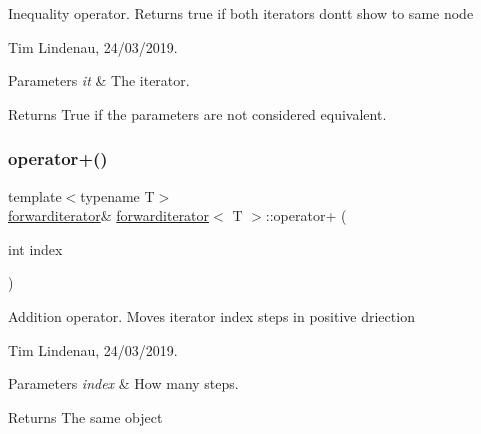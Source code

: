 Inequality operator. Returns true if both iterators dont\textquotesingle{}t show to same node 

Tim Lindenau, 24/03/2019. 


\begin{DoxyParams}{Parameters}
{\em it} & The iterator. \\
\hline
\end{DoxyParams}


\begin{DoxyReturn}{Returns}
True if the parameters are not considered equivalent. 
\end{DoxyReturn}
\mbox{\label{classforwarditerator_a380be6fded24cf931671d22bf0887eb0}} 
\subsubsection{\texorpdfstring{operator+()}{operator+()}}
{\footnotesize\ttfamily template$<$typename T$>$ \\
\mbox{\hyperlink{classforwarditerator}{forwarditerator}}\& \mbox{\hyperlink{classforwarditerator}{forwarditerator}}$<$ T $>$\+::operator+ (\begin{DoxyParamCaption}\item[{int}]{index }\end{DoxyParamCaption})\hspace{0.3cm}{\ttfamily [inline]}}



Addition operator. Moves iterator index steps in positive driection 

Tim Lindenau, 24/03/2019. 


\begin{DoxyParams}{Parameters}
{\em index} & How many steps. \\
\hline
\end{DoxyParams}


\begin{DoxyReturn}{Returns}
The same object 
\end{DoxyReturn}
\mbox{\label{classforwarditerator_acdf448963d78458a861511435f14d885}} 
